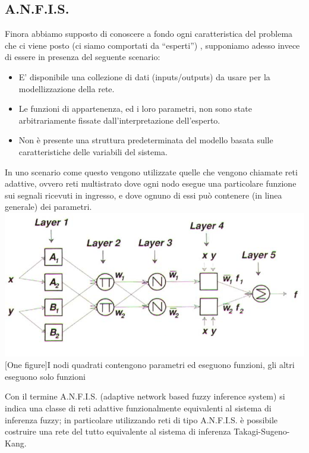 \subsection{A.N.F.I.S.}
Finora abbiamo supposto di conoscere a fondo ogni caratteristica del problema che ci viene posto (ci siamo comportati da “esperti”) , supponiamo adesso invece di essere in presenza del seguente scenario:

\begin{itemize}
  \item E' disponibile una collezione di dati (inputs/outputs) da usare per la modellizzazione della rete.
  \item Le funzioni di appartenenza, ed i loro parametri, non sono state arbitrariamente fissate dall'interpretazione dell'esperto.
  \item Non è presente una struttura predeterminata del modello basata sulle caratteristiche delle variabili del sistema.
\end{itemize}

In uno scenario come questo vengono utilizzate quelle che vengono chiamate reti adattive, ovvero reti multistrato dove ogni nodo esegue una particolare funzione sui segnali ricevuti in ingresso, e dove ognuno di essi può contenere (in linea generale) dei parametri.\\

\vspace{20px}
\includegraphics[scale=0.5]{images/anfis/adaptive.png}
[One figure]{I nodi quadrati contengono parametri ed eseguono funzioni, gli altri eseguono solo funzioni}
\vspace{20px}

Con il termine A.N.F.I.S. (adaptive network based fuzzy inference system) si indica una classe di reti adattive funzionalmente equivalenti al sistema di inferenza fuzzy; in particolare utilizzando reti di tipo A.N.F.I.S. è possibile costruire una rete del tutto equivalente al sistema di inferenza Takagi-Sugeno-Kang.

